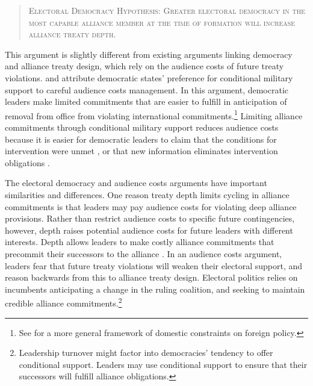 \documentclass[12pt]{article}
\begin{document}
\begin{quote}
\textsc{Electoral Democracy Hypothesis: Greater electoral democracy in the most capable alliance member at the time of formation will increase alliance treaty depth.}
\end{quote}   


This argument is slightly different from existing arguments linking democracy and alliance treaty design, which rely on the audience costs of future treaty violations. 
\citet{Mattes2012} and \citet{Chibaetal2015} attribute democratic states' preference for conditional military support to careful audience costs management. 
In this argument, democratic leaders make limited commitments that are easier to fulfill in anticipation of removal from office from violating international commitments.\footnote{See \citet{HydeSaunders2020} for a more general framework of domestic constraints on foreign policy.} 
Limiting alliance commitments through conditional military support reduces audience costs because it is easier for democratic leaders to claim that the conditions for intervention were unmet \citep{FjelstulReiter2019}, or that new information eliminates intervention obligations \citep{LevenduskyHorowitz2012}. 


The electoral democracy and audience costs arguments have important similarities and differences. 
One reason treaty depth limits cycling in alliance commitments is that leaders may pay audience costs for violating deep alliance provisions. 
Rather than restrict audience costs to specific future contingencies, however, depth raises potential audience costs for future leaders with different interests. 
Depth allows leaders to make costly alliance commitments that precommit their successors to the alliance \citep{Mattes2012a}. 
In an audience costs argument, leaders fear that future treaty violations will weaken their electoral support, and reason backwards from this to alliance treaty design. 
Electoral politics relies on incumbents anticipating a change in the ruling coalition, and seeking to maintain credible alliance commitments.\footnote{Leadership turnover might factor into democracies' tendency to offer conditional support. Leaders may use conditional support to ensure that their successors will fulfill alliance obligations.} 
\end{document}
